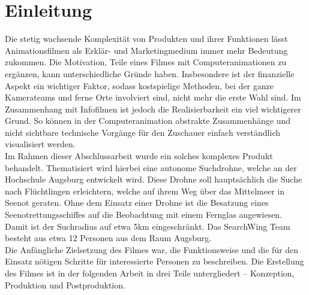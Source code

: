 
\chapter{Einleitung}

Die stetig wachsende Komplexität von Produkten und ihrer Funktionen lässt Animationsfilmen als Erklär- und Marketingmedium immer mehr Bedeutung zukommen. Die Motivation, Teile eines Filmes mit Computeranimationen zu ergänzen, kann unterschiedliche Gründe haben. 
Insbesondere ist der finanzielle Aspekt ein wichtiger Faktor, sodass kostspielige Methoden, bei der ganze Kamerateams und ferne Orte involviert sind, nicht mehr die erste Wahl sind.
Im Zusammenhang mit Infofilmen ist jedoch die Realisierbarkeit ein viel wichtigerer Grund. So können in der Computeranimation abstrakte Zusammenhänge und nicht sichtbare technische Vorgänge für den Zuschauer einfach verständlich visualisiert werden.\\
Im Rahmen dieser Abschlussarbeit wurde ein solches komplexes Produkt behandelt. Thematisiert wird hierbei eine autonome Suchdrohne, welche an der Hochschule Augsburg entwickelt wird. Diese Drohne soll hauptsächlich die Suche nach Flüchtlingen erleichtern, welche auf ihrem Weg über das Mittelmeer in Seenot geraten. Ohne dem Einsatz einer Drohne ist die Besatzung eines Seenotrettungsschiffes auf die Beobachtung mit einem Fernglas angewiesen. Damit ist der Suchradius auf etwa 5km eingeschränkt. Das SearchWing Team besteht aus etwa 12 Personen aus dem Raum Augsburg.\\
Die Anfängliche Zielsetzung des Filmes war, die Funktionsweise und die für den Einsatz nötigen Schritte für interessierte Personen zu beschreiben.
Die Erstellung des Filmes ist in der folgenden Arbeit in drei Teile untergliedert -- Konzeption, Produktion und Postproduktion.